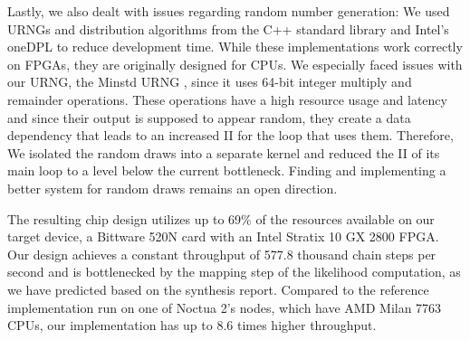 Lastly, we also dealt with issues regarding random number generation: We used \acfp{URNG} and distribution algorithms from the C++ standard library and Intel's oneDPL to reduce development time. While these implementations work correctly on \acp{FPGA}, they are originally designed for \acp{CPU}. We especially faced issues with our \ac{URNG}, the Minstd \ac{URNG} \cite{park1988random}, since it uses 64-bit integer multiply and remainder operations. These operations have a high resource usage and latency and since their output is supposed to appear random, they create a data dependency that leads to an increased \acf{II} for the loop that uses them. Therefore, We isolated the random draws into a separate kernel and reduced the \ac{II} of its main loop to a level below the current bottleneck. Finding and implementing a better system for random draws remains an open direction.

The resulting chip design utilizes up to 69\% of the resources available on our target device, a Bittware 520N card with an Intel Stratix 10 GX 2800 \ac{FPGA}. Our design achieves a constant throughput of 577.8 thousand chain steps per second and is bottlenecked by the mapping step of the likelihood computation, as we have predicted based on the synthesis report. Compared to the reference implementation run on one of Noctua 2's nodes, which have AMD Milan 7763 \acp{CPU}, our implementation has up to 8.6 times higher throughput.

